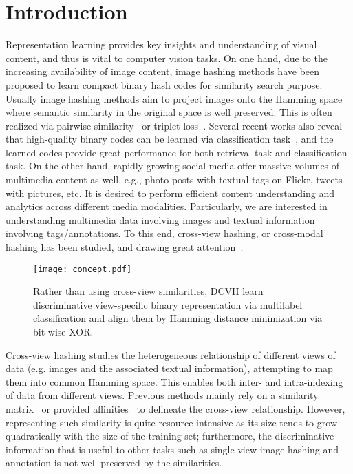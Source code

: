 \documentclass[10pt,twocolumn,letterpaper]{article}
\begin{document}
\section{Introduction}

Representation learning provides key insights and understanding of visual content, and thus is vital to computer vision tasks. On one hand, due to the increasing availability of image content, image hashing methods have been proposed to learn compact binary hash codes for similarity search purpose. Usually image hashing methods aim to project images onto the Hamming space where semantic similarity in the original space is well preserved. This is often realized via pairwise similarity~\cite{Liu_2016_CVPR,dhn} or triplet loss~\cite{Zhuang_2016_CVPR}. Several recent works also reveal that high-quality binary codes can be learned via classification task~\cite{cebits,Shen_2015_CVPR,dbe}, and the learned codes provide great performance for both retrieval task and classification task. On the other hand, rapidly growing social media offer massive volumes of multimedia content as well, e.g., photo posts with textual tags on Flickr, tweets with pictures, etc. It is desired to perform efficient content understanding and analytics across different media modalities. Particularly, we are interested in understanding multimedia data involving images and textual information involving tags/annotations. To this end, cross-view hashing, or cross-modal hashing has been studied, and drawing great attention~\cite{cvh,cmssh,cmfh,seph,acq,dcmh,dvsh}. 
\begin{figure}[t]
	\centering
    		  \texttt{[image: concept.pdf]}
  	\caption{Rather than using cross-view similarities, DCVH learn discriminative view-specific binary representation via multilabel classification and align them by Hamming distance minimization via bit-wise XOR.}
\label{fig:concept}
\end{figure}

Cross-view hashing studies the heterogeneous relationship of different views of data (e.g. images and the associated textual information), attempting to map them into common Hamming space. This enables both inter- and intra-indexing of data from different views. Previous methods mainly rely on a similarity matrix~\cite{dcmh,THN,cvh,cmssh} or provided affinities~\cite{seph,acq} to delineate the cross-view relationship. However, representing such similarity is quite resource-intensive as its size tends to grow quadratically with the size of the training set; furthermore, the discriminative information that is useful to other tasks such as single-view image hashing and annotation is not well preserved by the similarities. 
\end{document}
